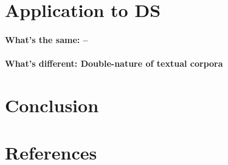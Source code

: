 \documentclass{article}
\begin{document}
\section{Application to DS}\hypertarget{sec4}{ }
\paragraph{What's the same: --}
\paragraph{What's different: Double-nature of textual corpora}
\section{Conclusion}

\section{References}\hypertarget{sec5}{ }
\end{document}
